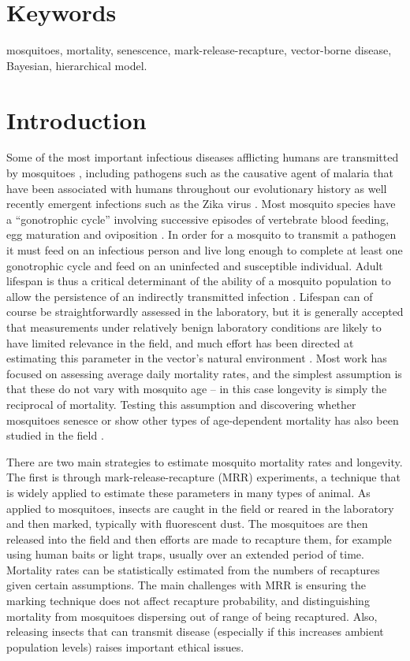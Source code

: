 \documentclass[]{article}
\begin{document}
\section{Keywords}\label{keywords}

mosquitoes, mortality, senescence, mark-release-recapture, vector-borne disease, Bayesian, hierarchical model.

\section{Introduction}\label{introduction}

Some of the most important infectious diseases afflicting humans are
transmitted by mosquitoes \citep{gates2014}, including pathogens such as the causative
agent of malaria that have been associated with humans throughout our
evolutionary history \citep{carter2002evolutionary} as well recently emergent infections such as the
Zika virus \citep{world2016statement}. Most mosquito species have a ``gonotrophic cycle'' involving
successive episodes of vertebrate blood feeding, egg maturation and
oviposition \citep{silver2007mosquito}. In order for a mosquito to transmit a pathogen it must feed
on an infectious person and live long enough to complete at least one
gonotrophic cycle and feed on an uninfected and susceptible individual.
Adult lifespan is thus a critical determinant of the ability of a
mosquito population to allow the persistence of an indirectly
transmitted infection \citep{macdonald1957epidemiology}. Lifespan can of course be straightforwardly
assessed in the laboratory, but it is generally accepted that
measurements under relatively benign laboratory conditions are likely to
have limited relevance in the field, and much effort has been directed
at estimating this parameter in the vector's natural environment \citep{clements1981analysis,guerra2014global}. Most
work has focused on assessing average daily mortality rates, and the
simplest assumption is that these do not vary with mosquito age -- in
this case longevity is simply the reciprocal of mortality. Testing this
assumption and discovering whether mosquitoes senesce or show other
types of age-dependent mortality has also been studied in the field \citep{clements1981analysis,harrington2008age,hugo2014adult}.

There are two main strategies to estimate mosquito mortality rates and
longevity. The first is through mark-release-recapture (MRR)
experiments, a technique that is widely applied to estimate these
parameters in many types of animal. As applied to mosquitoes, insects
are caught in the field or reared in the laboratory and then marked,
typically with fluorescent dust. The mosquitoes are then released into
the field and then efforts are made to recapture them, for example using
human baits or light traps, usually over an extended period of time.
Mortality rates can be statistically estimated from the numbers of
recaptures given certain assumptions. The main challenges with MRR is
ensuring the marking technique does not affect recapture probability,
and distinguishing mortality from mosquitoes dispersing out of range of
being recaptured. Also, releasing insects that can transmit disease
(especially if this increases ambient population levels) raises
important ethical issues.
\end{document}
